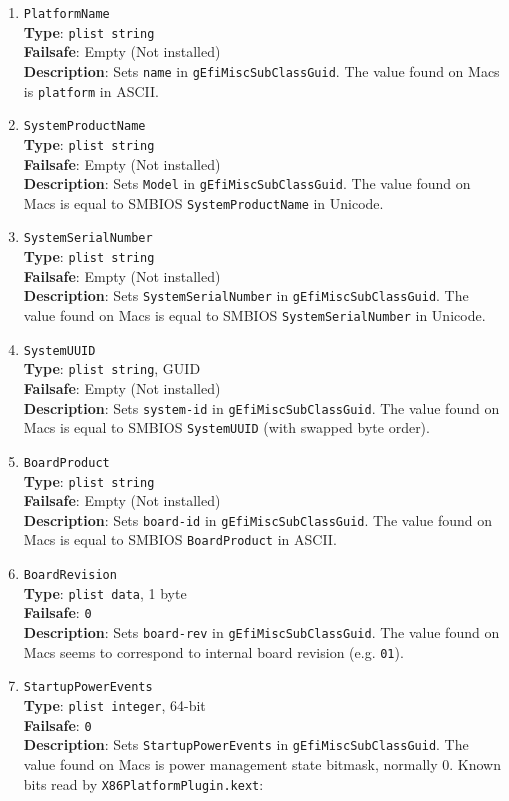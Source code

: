 \documentclass[]{article}
\begin{document}
\begin{enumerate}
\item
  \texttt{PlatformName}\\
  \textbf{Type}: \texttt{plist\ string}\\
  \textbf{Failsafe}: Empty (Not installed)\\
  \textbf{Description}: Sets \texttt{name} in
  \texttt{gEfiMiscSubClassGuid}. The value found on Macs is
  \texttt{platform} in ASCII.
\item
  \texttt{SystemProductName}\\
  \textbf{Type}: \texttt{plist\ string}\\
  \textbf{Failsafe}: Empty (Not installed)\\
  \textbf{Description}: Sets \texttt{Model} in
  \texttt{gEfiMiscSubClassGuid}. The value found on Macs is equal to SMBIOS
  \texttt{SystemProductName} in Unicode.
\item
  \texttt{SystemSerialNumber}\\
  \textbf{Type}: \texttt{plist\ string}\\
  \textbf{Failsafe}: Empty (Not installed)\\
  \textbf{Description}: Sets \texttt{SystemSerialNumber} in
  \texttt{gEfiMiscSubClassGuid}. The value found on Macs is equal to SMBIOS
  \texttt{SystemSerialNumber} in Unicode.
\item
  \texttt{SystemUUID}\\
  \textbf{Type}: \texttt{plist\ string}, GUID\\
  \textbf{Failsafe}: Empty (Not installed)\\
  \textbf{Description}: Sets \texttt{system-id} in
  \texttt{gEfiMiscSubClassGuid}. The value found on Macs is equal to SMBIOS
  \texttt{SystemUUID} (with swapped byte order).
\item
  \texttt{BoardProduct}\\
  \textbf{Type}: \texttt{plist\ string}\\
  \textbf{Failsafe}: Empty (Not installed)\\
  \textbf{Description}: Sets \texttt{board-id} in
  \texttt{gEfiMiscSubClassGuid}. The value found on Macs is equal to SMBIOS
  \texttt{BoardProduct} in ASCII.
\item
  \texttt{BoardRevision}\\
  \textbf{Type}: \texttt{plist\ data}, 1 byte\\
  \textbf{Failsafe}: \texttt{0}\\
  \textbf{Description}: Sets \texttt{board-rev} in
  \texttt{gEfiMiscSubClassGuid}. The value found on Macs seems to correspond
  to internal board revision (e.g. \texttt{01}).
\item
  \texttt{StartupPowerEvents}\\
  \textbf{Type}: \texttt{plist\ integer}, 64-bit\\
  \textbf{Failsafe}: \texttt{0}\\
  \textbf{Description}: Sets \texttt{StartupPowerEvents} in
  \texttt{gEfiMiscSubClassGuid}. The value found on Macs is power management
  state bitmask, normally 0. Known bits read by
  \texttt{X86PlatformPlugin.kext}:


\end{enumerate}
\end{document}
